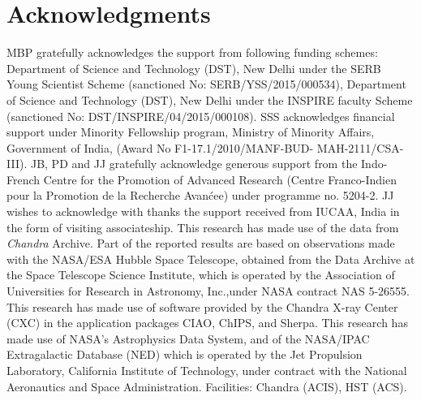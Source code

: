 \documentclass[useASM,usenatbib]{mn2e}
\newcommand{\mnras}{MNRAS}
\begin{document}
\section*{Acknowledgments}
MBP gratefully acknowledges the support from following funding schemes:  Department of Science and Technology (DST), New Delhi under the SERB Young Scientist Scheme (sanctioned No: SERB/YSS/2015/000534), Department of Science and Technology (DST), New Delhi under the INSPIRE faculty  Scheme (sanctioned No: DST/INSPIRE/04/2015/000108). SSS acknowledges
financial support under Minority Fellowship program, Ministry of
Minority Affairs, Government of India, (Award No
F1-17.1/2010/MANF-BUD- MAH-2111/CSA-III).  JB, PD and JJ gratefully
acknowledge generous support from the Indo-French Centre for the
Promotion of Advanced Research (Centre Franco-Indien pour la Promotion
de la Recherche Avan\'{c}ee) under programme no. 5204-2. JJ wishes to
acknowledge with thanks the support received from IUCAA, India in the
form of visiting associateship. This research has made use of the data
from {\it Chandra} Archive. Part of the reported results are based on
observations made with the NASA/ESA Hubble Space Telescope, obtained
from the Data Archive at the Space Telescope Science Institute, which
is operated by the Association of Universities for Research in
Astronomy, Inc.,under NASA contract NAS 5-26555. This research has
made use of software provided by the Chandra X-ray Center (CXC) in the
application packages CIAO, ChIPS, and Sherpa.  This research has made
use of NASA's Astrophysics Data System, and of the NASA/IPAC
Extragalactic Database (NED) which is operated by the Jet Propulsion
Laboratory, California Institute of Technology, under contract with
the National Aeronautics and Space Administration.  Facilities:
Chandra (ACIS), HST (ACS).
\def\aj{AJ}%
\def\actaa{Acta Astron.}%
\def\araa{ARA\&A}%
\def\apj{ApJ}%
\def\apjl{ApJ}%
\def\apjs{ApJS}%
\def\ao{Appl.~Opt.}%
\def\apss{Ap\&SS}%
\def\aap{A\&A}%
\def\aapr{A\&A~Rev.}%
\def\aaps{A\&AS}%
\def\azh{AZh}%
\def\baas{BAAS}%
\def\bac{Bull. astr. Inst. Czechosl.}%
\def\caa{Chinese Astron. Astrophys.}%
\def\cjaa{Chinese J. Astron. Astrophys.}%
\def\icarus{Icarus}%
\def\jcap{J. Cosmology Astropart. Phys.}%
\def\jrasc{JRASC}%
\def\mnras{MNRAS}%
\def\memras{MmRAS}%
\def\na{New A}%
\def\nar{New A Rev.}%
\def\pasa{PASA}%
\def\pra{Phys.~Rev.~A}%
\def\prb{Phys.~Rev.~B}%
\def\prc{Phys.~Rev.~C}%
\def\prd{Phys.~Rev.~D}%
\end{document}
